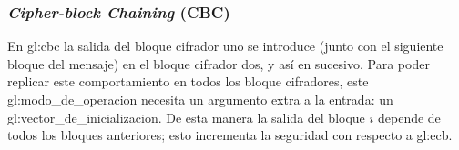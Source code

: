 %
%

\subsubsection{\textit{Cipher-block Chaining} (CBC)}
\label{sec:cbc}

En \gls{gl:cbc} la salida del bloque cifrador uno se introduce (junto con
el siguiente bloque del mensaje) en el bloque cifrador dos, y así en sucesivo.
Para poder replicar este comportamiento en todos los bloque cifradores, este
\gls{gl:modo_de_operacion} necesita un argumento extra a la entrada: un
\gls{gl:vector_de_inicializacion}. De esta manera la salida del bloque $ i $
depende de todos los bloques anteriores; esto incrementa la seguridad con
respecto a \gls{gl:ecb}.

